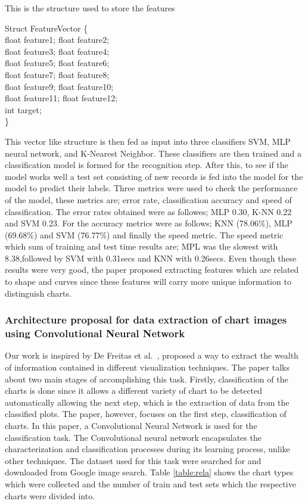 \documentclass[12pt, a4paper,oneside]{report}
\begin{document}
\begin{algorithm}
\caption{This is the structure used to store the features}
\label{alg:1}
Struct FeatureVector \{\\
	float feature1; float feature2;\\
	float feature3; float feature4;\\
	float feature5; float feature6;\\
	float feature7; float feature8;\\
	float feature9; float feature10;\\
	float feature11; float feature12;\\
	int target;\\
\}
\end{algorithm}

This vector like structure is then fed as input into three classifiers SVM, MLP neural network, and K-Nearest Neighbor. These classifiers are then trained and a classification model is formed for the recognition step. After this, to see if the model works well a test set consisting of new records is fed into the model for the model to predict their labels. Three metrics were used to check the performance of the model, these metrics are; error rate,
classification accuracy and speed of classification. The error rates obtained were as followes; MLP 0.30, K-NN 0.22 and SVM 0.23. For the accuracy metrics were as follows; KNN (78.06\%), MLP (69.68\%) and SVM (76.77\%) and finally the speed metric. The speed metric which sum of training and test time results are; MPL was the slowest with 8.38,followed by SVM with 0.31secs and  KNN with 0.26secs. Even though these results were very good, the paper proposed extracting features which are related to shape and curves since these features will carry more unique information to distinguish charts.

\subsubsection{Architecture proposal for data extraction of chart images using Convolutional Neural Network}
Our work is inspired by De Freitas et al.~\cite{junior2017archi}, proposed a way to extract the wealth of information contained in different visualization techniques. The paper talks about two main stages of accomplishing this task. Firstly, classification of the charts is done since it allows a different variety of chart to be detected automatically allowing the next step, which is the extraction of data from the classified plots. The paper, however, focuses on the first step, classification of charts. In this paper, a Convolutional Neural Network is used for the classification task. The Convolutional neural network encapsulates the characterization and classification processes during its learning process, unlike other techniques. The dataset used for this task were searched for and downloaded from Google image search. Table \ref{table:rela} shows the chart types which were collected and the number of train and test sets which the respective charts were divided into.
\end{document}
